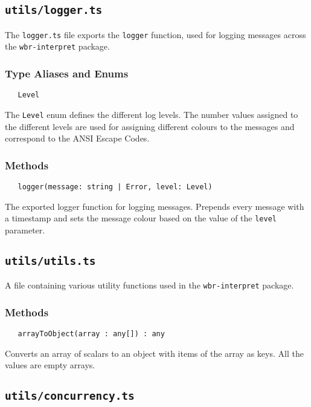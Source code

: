 \subsection{\texttt{utils/logger.ts}}

The \texttt{logger.ts} file exports the \texttt{logger} function, used for logging messages across the \texttt{wbr-interpret} package.

\subsubsection{Type Aliases and Enums}

\verb|   Level|

\smallskip

The \texttt{Level} enum defines the different log levels.
The number values assigned to the different levels are used for assigning different colours to the messages
and correspond to the ANSI Escape Codes.

\subsubsection{Methods}

\verb$   logger(message: string | Error, level: Level)$

The exported logger function for logging messages.
Prepends every message with a timestamp and sets the message colour based on the value of the \texttt{level} parameter.

\subsection{\texttt{utils/utils.ts}}

A file containing various utility functions used in the \texttt{wbr-interpret} package.

\subsubsection{Methods}

\verb|   arrayToObject(array : any[]) : any|

Converts an array of scalars to an object with items of the array as keys.
All the values are empty arrays.

\subsection{\texttt{utils/concurrency.ts}}

